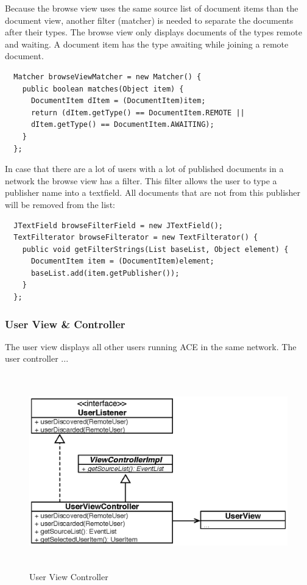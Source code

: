 Because the browse view uses the same source list of document items than the document view, another filter (matcher) is needed to separate the documents after their types. The browse view only displays documents of the types remote and waiting. A document item has the type awaiting while joining a remote document.
\begin{verbatim}
  Matcher browseViewMatcher = new Matcher() {
    public boolean matches(Object item) {
      DocumentItem dItem = (DocumentItem)item;
      return (dItem.getType() == DocumentItem.REMOTE ||
      dItem.getType() == DocumentItem.AWAITING);
    }
  };
\end{verbatim}
In case that there are a lot of users with a lot of published documents in a network the browse view has a filter. This filter allows the user to type a publisher name into a textfield. All documents that are not from this publisher will be removed from the list:
\begin{verbatim}
  JTextField browseFilterField = new JTextField();
  TextFilterator browseFilterator = new TextFilterator() {
    public void getFilterStrings(List baseList, Object element) {
      DocumentItem item = (DocumentItem)element;
      baseList.add(item.getPublisher());
    }
  };
\end{verbatim}







\subsubsection{User View \& Controller}
The user view displays all other users running ACE in the same network. The user controller ...
\begin{figure}[H]
\begin{center}
  \includegraphics[height=3.33in, width=5.62in]{../images/finalreport/application_userview.eps}
\caption{User View Controller}
\label{application_userview}
\end{center}
\end{figure}

